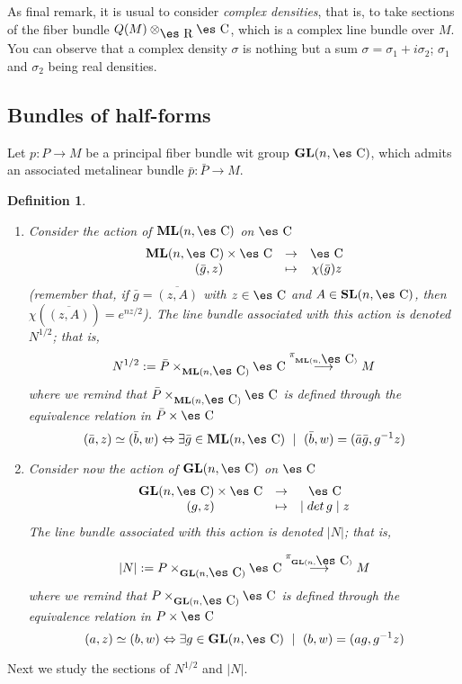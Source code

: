 \documentclass[12pt]{article}
\newtheorem{definition}{Definition}
\def\ben{\begin{enumerate}}
\def\een{\end{enumerate}}
\def\mapping#1{\mathrel{\mathop{\longrightarrow}\limits^{#1}}}
\def\GL{{\bf GL}(n,\Complex )}
\def\SL{{\bf SL}(n,\Complex )}
\def\ML{{\bf ML}(n,\Complex )}
\def\Real{\mbox{\es R}}
\def\Complex{\mbox{\es C}}
\begin{document}
As final remark, it is usual to consider {\it complex densities},
that is, to take sections of the fiber bundle $Q(M) \otimes_{\Real}
\Complex$,
which is a complex line bundle over $M$. You can observe that a complex
density
$\sigma$ is nothing but a sum $\sigma = \sigma_1 + i\sigma_2$;
$\sigma_1$ and $\sigma_2$ being real densities.



\subsection{Bundles of half-forms}



Let $p\colon P \to M$ be a principal fiber bundle wit group $\GL$,
which admits an associated metalinear bundle $\bar p : \bar P \to M$.

\begin{definition}
\ben
\item
Consider the action of $\ML$ on $\Complex$
$$
\begin{array}{ccc}
\ML \times \Complex & \to & \Complex
\\
(\bar g,z) & \mapsto & \chi (\bar g)z
\end{array}
$$
(remember that, if $\bar g = \overline{(z,A)}$
with $z \in \Complex$ and $A \in \SL$, then $\chi (\overline{(z,A)}) =
e^{nz/2}$).
The line bundle associated with this action is denoted $N^{1/2}$; that
is,
$$
N^{1/2} := \bar P \times_{\ML} \Complex \mapping{\pi_{\ML}} M
$$
where we remind that $\bar P \times_{\ML} \Complex$
is defined through the equivalence relation in $\bar P \times \Complex$
$$
(\bar a,z) \simeq (\bar b,w)
\Leftrightarrow
\exists \bar g \in \ML \ \mid \ (\bar b,w)=(\bar a \bar g,g^{-1}z)
$$
\item
Consider now the action of $\GL$ on $\Complex$
$$
\begin{array}{ccc}
\GL \times \Complex & \to & \Complex
\\
(g,z) & \mapsto & \mid det\, g \mid z
\end{array}
$$
The line bundle associated with this action is denoted $| N |$; that is,

$$
| N | := P \times_{\GL} \Complex \mapping{\pi_{\GL}} M
$$
where we remind that $P \times_{\GL} \Complex$
is defined through the equivalence relation in $P \times \Complex$
$$
(a,z) \simeq (b,w) \Leftrightarrow \exists g \in \GL \ \mid \
(b,w)=(ag,g^{-1}z)
$$
\een
\label{absn}
\end{definition}

Next we study the sections of $N^{1/2}$ and $| N |$.
\end{document}
